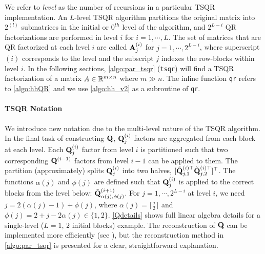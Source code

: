 We refer to \emph{level} as the number of recursions in a particular TSQR implementation. 
An $L$-level TSQR algorithm partitions the original matrix into $2^{(l)}$ submatrices in the initial or $0^{th}$ level of the algorithm, and $2^{L-i}$ QR factorizations are performed in level $i$ for $i = 1 , \cdots, L$. 
The set of matrices that are QR factorized at each level $i$ are called $\mathbf{A}_j^{(i)}$ for $j = 1, \cdots, 2^{L-i}$, where superscript $(i)$ corresponds to the level and the subscript $j$ indexes the row-blocks within level $i$.
In the following sections, \cref{algo:par_tsqr} ({\tt tsqr}) will find a TSQR factorization of a matrix $A\in\mathbb{R}^{m\times n}$ where $m \gg n$. 
The inline function {\tt qr} refers to \cref{algo:hhQR} and we use \cref{algo:hh_v2} as a subroutine of {\tt qr}.

\paragraph{TSQR Notation}
We introduce new notation due to the multi-level nature of the TSQR algorithm.
In the final task of constructing $\mathbf{Q}$, $\mathbf{Q}_j^{(i)}$ factors are aggregated from each block at each level.
Each $\mathbf{Q}_j^{(i)}$ factor from level $i$ is partitioned such that two corresponding $\mathbf{Q}^{(i-1)}$ factors from level $i-1$ can be applied to them. 
The partition (approximately) splits $\mathbf{Q}_{j}^{(i)}$ into two halves, $[\tilde{\mathbf{Q}}_{j, 1}^{(i)\top} \tilde{\mathbf{Q}}_{j, 2}^{(i)\top}]^{\top}$.
The functions $\alpha(j)$ and $\phi(j)$ are defined such that $\mathbf{Q}_j^{(i)}$ is applied to the correct blocks from the level below: $\tilde{\mathbf{Q}}_{\alpha(j), \phi(j)}^{(i+1)}$.
For $j = 1 , \cdots, 2^{L-i}$ at level $i$, we need $j = 2(\alpha(j)-1) + \phi(j)$, where $\alpha(j) = \lceil \frac{j}{2}\rceil$ and $\phi(j) = 2 + j - 2\alpha(j) \in\{1,2\}$.
\cref{Qdetails} shows full linear algebra details for a single-level ($L=1$, $2$ initial blocks) example.
The reconstruction of $\mathbf{Q}$ can be implemented more efficiently (see \cite{BDGJNS2014}), but the reconstruction method in \cref{algo:par_tsqr} is presented for a clear, straightforward explanation.


